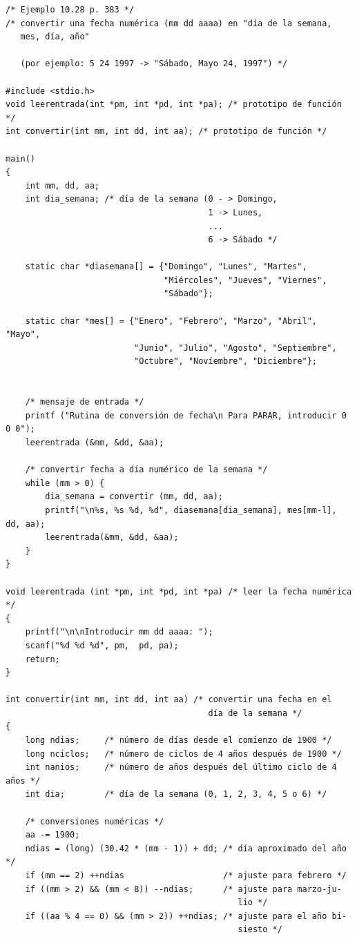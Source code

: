 \documentclass{article}
\begin{document}
\begin{verbatim}
/* Ejemplo 10.28 p. 383 */
/* convertir una fecha numérica (mm dd aaaa) en "día de la semana,
   mes, día, año"
   
   (por ejemplo: 5 24 1997 -> "Sábado, Mayo 24, 1997") */
   
#include <stdio.h>
void leerentrada(int *pm, int *pd, int *pa); /* prototipo de función */
int convertir(int mm, int dd, int aa); /* prototipo de función */

main()
{
    int mm, dd, aa;
    int dia_semana; /* día de la semana (0 - > Domingo,
                                         1 -> Lunes,
                                         ...
                                         6 -> Sábado */
                                         
    static char *diasemana[] = {"Domingo", "Lunes", "Martes",
                                "Miércoles", "Jueves", "Viernes",
                                "Sábado"};
                                         
    static char *mes[] = {"Enero", "Febrero", "Marzo", "Abril", "Mayo",
                          "Junio", "Julio", "Agosto", "Septiembre",
                          "Octubre", "Novíembre", "Diciembre"};


    /* mensaje de entrada */
    printf ("Rutina de conversión de fecha\n Para PARAR, introducir 0 0 0");
    leerentrada (&mm, &dd, &aa);
    
    /* convertir fecha a día numérico de la semana */
    while (mm > 0) {
        dia_semana = convertir (mm, dd, aa);
        printf("\n%s, %s %d, %d", diasemana[dia_semana], mes[mm-l], dd, aa);
        leerentrada(&mm, &dd, &aa);
    }
}

void leerentrada (int *pm, int *pd, int *pa) /* leer la fecha numérica */ 
{
    printf("\n\nIntroducir mm dd aaaa: ");
    scanf("%d %d %d", pm,  pd, pa);
    return;
}

int convertir(int mm, int dd, int aa) /* convertir una fecha en el 
                                         día de la semana */
{
    long ndias;     /* número de días desde el comienzo de 1900 */
    long nciclos;   /* número de ciclos de 4 años después de 1900 */
    int nanios;     /* número de años después del último ciclo de 4 años */
    int dia;        /* día de la semana (0, 1, 2, 3, 4, 5 o 6) */

    /* conversiones numéricas */
    aa -= 1900;
    ndias = (long) (30.42 * (mm - 1)) + dd; /* día aproximado del año */
    if (mm == 2) ++ndias                    /* ajuste para febrero */
    if ((mm > 2) && (mm < 8)) --ndias;      /* ajuste para marzo-ju-
                                               lio */
    if ((aa % 4 == 0) && (mm > 2)) ++ndias; /* ajuste para el año bi-
                                               siesto */
    

\end{verbatim}
\end{document}
